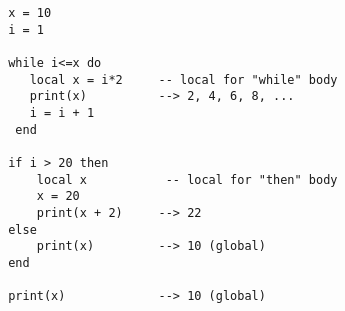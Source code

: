 \begin{lstlisting}
 x = 10
 i = 1  
    
 while i<=x do
    local x = i*2     -- local for "while" body
    print(x)          --> 2, 4, 6, 8, ...
    i = i + 1
  end
  
 if i > 20 then
     local x           -- local for "then" body
     x = 20
     print(x + 2)	  --> 22
 else
     print(x)         --> 10 (global)
 end
    
 print(x)             --> 10 (global)
\end{lstlisting}

  